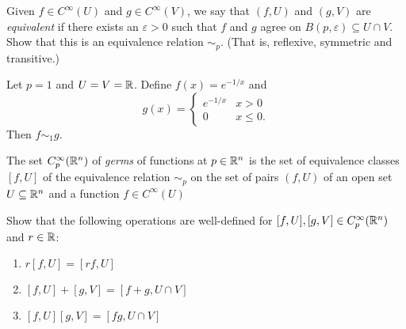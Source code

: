 \begin{frame}
  \begin{definition}
    Given $f \in C^{\infty}(U)$ and $g \in C^{\infty}(V)$, we say that $(f, U)$ and
    $(g, V)$ are {\em equivalent} if there exists an $\varepsilon > 0$ such that $f$
    and $g$ agree on $B(p, \varepsilon) \subseteq U \cap V$. Show that this is
    an equivalence relation $\sim_p$. (That is, reflexive, symmetric and transitive.)
  \end{definition}
  \begin{example}
    Let $p = 1$ and $U = V = \mathbb R$. Define $f(x) = e^{-1/x}$ and 
    \begin{displaymath}
      g(x) =
      \begin{cases}
        e^{-1/x} & x > 0 \\
        0 & x \le 0.
      \end{cases}
    \end{displaymath}
    Then $f \sim_1 g$.
  \end{example}
\end{frame}

\begin{frame}
  \begin{definition}[Germs]
    The set $C^{\infty}_p(\mathbb R^n)$ of {\em germs} of functions at $p \in \mathbb R^n$ is
    the set of equivalence classes $[f, U]$ of the equivalence relation $\sim_p$ on
    the set of pairs $(f, U)$ of an open set $U \subseteq \mathbb R^n$ and a function
    $f \in C^{\infty}(U)$
  \end{definition}
  \begin{exercise}
    Show that the following operations are well-defined for $[f, U], [g, V] \in 
    C^{\infty}_p(\mathbb R^n)$ and $r \in \mathbb R$:
    \begin{enumerate}
      \item $r[f, U] = [rf, U]$
      \item $[f, U] + [g, V] = [f + g, U \cap V]$
      \item $[f, U] [g, V] = [fg, U \cap V]$
    \end{enumerate}
  \end{exercise}
\end{frame}

